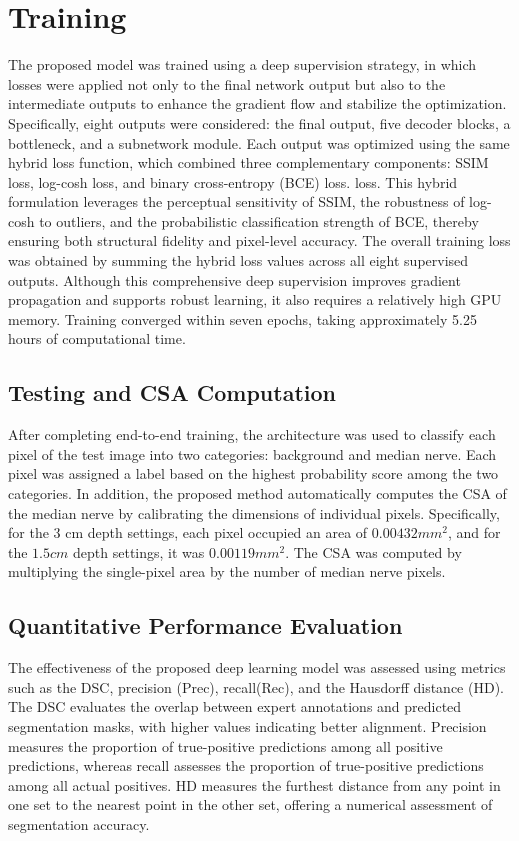 \section*{Training}\label{sec:training_section}
The proposed model was trained using a deep supervision strategy, in which losses were applied not only to the final network output but also to the intermediate outputs to enhance the gradient flow and stabilize the optimization. Specifically, eight outputs were considered: the final output, five decoder blocks, a bottleneck, and a subnetwork module. Each output was optimized using the same hybrid loss function, which combined three complementary components: SSIM loss, log-cosh loss, and binary cross-entropy (BCE) loss. loss. This hybrid formulation leverages the perceptual sensitivity of SSIM, the robustness of log-cosh to outliers, and the probabilistic classification strength of BCE, thereby ensuring both structural fidelity and pixel-level accuracy. The overall training loss was obtained by summing the hybrid loss values across all eight supervised outputs. Although this comprehensive deep supervision improves gradient propagation and supports robust learning, it also requires a relatively high GPU memory. Training converged within seven epochs, taking approximately 5.25 hours of computational time.




\subsection{Testing and CSA Computation}
\noindent
After completing end-to-end training, the architecture was used to classify each pixel of the test image into two categories: background and median nerve.  Each pixel was assigned a label based on the highest probability score among the two categories. In addition, the proposed method automatically computes the CSA of the median nerve by calibrating the dimensions of individual pixels. Specifically, for the $\text{3 cm}$ depth settings, each pixel occupied an area of $0.00432 mm^{2}$, and for the $1.5 cm$ depth settings, it was $0.00119 mm^{2}$. The CSA was computed by multiplying the single-pixel area by the number of median nerve pixels.
\subsection{Quantitative Performance Evaluation}
\noindent
The effectiveness of the proposed deep learning model was assessed using metrics such as the DSC\cite{zou2004statistical}, precision (Prec), recall(Rec), and the Hausdorff distance (HD)\cite{huttenlocher1993comparing}. The DSC evaluates the overlap between expert annotations and predicted segmentation masks, with higher values indicating better alignment. Precision measures the proportion of true-positive predictions among all positive predictions, whereas recall assesses the proportion of true-positive predictions among all actual positives. HD measures the furthest distance from any point in one set to the nearest point in the other set, offering a numerical assessment of segmentation accuracy. 

